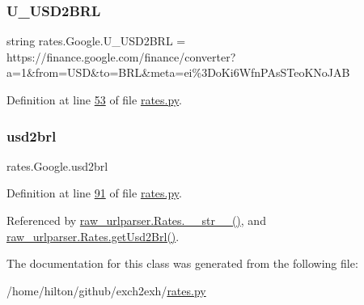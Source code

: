 \subsubsection{\texorpdfstring{U\+\_\+\+U\+S\+D2\+B\+RL}{U\_USD2BRL}}
{\footnotesize\ttfamily string rates.\+Google.\+U\+\_\+\+U\+S\+D2\+B\+RL = \textquotesingle{}https\+://finance.\+google.\+com/finance/converter?a=1\&from=U\+SD\&to=B\+RL\&meta=ei\%3\+Do\+Ki6\+Wfn\+P\+As\+S\+Teo\+K\+No\+J\+A\+B\textquotesingle{}\hspace{0.3cm}{\ttfamily [static]}}



Definition at line \hyperlink{rates_8py_source_l00053}{53} of file \hyperlink{rates_8py_source}{rates.\+py}.

\mbox{\label{classrates_1_1_google_a94c28f6d60d5d6afc075416d7378471c}} 
\subsubsection{\texorpdfstring{usd2brl}{usd2brl}}
{\footnotesize\ttfamily rates.\+Google.\+usd2brl}



Definition at line \hyperlink{rates_8py_source_l00091}{91} of file \hyperlink{rates_8py_source}{rates.\+py}.



Referenced by \hyperlink{raw__urlparser_8py_source_l00038}{raw\+\_\+urlparser.\+Rates.\+\_\+\+\_\+str\+\_\+\+\_\+()}, and \hyperlink{raw__urlparser_8py_source_l00032}{raw\+\_\+urlparser.\+Rates.\+get\+Usd2\+Brl()}.



The documentation for this class was generated from the following file\+:\begin{DoxyCompactItemize}
\item 
/home/hilton/github/exch2exh/\hyperlink{rates_8py}{rates.\+py}\end{DoxyCompactItemize}
